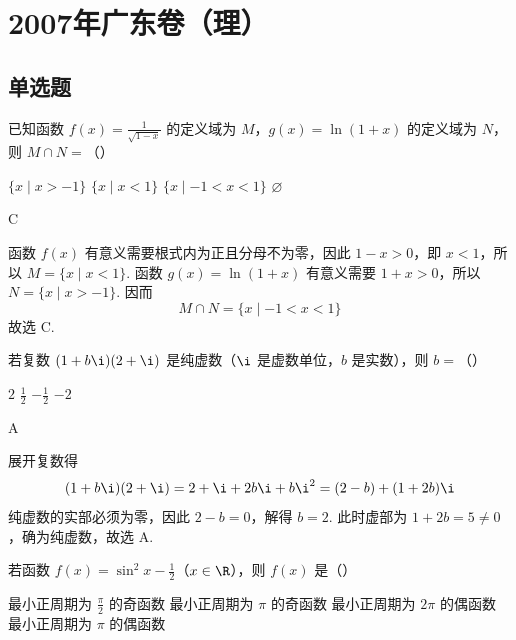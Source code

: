 \chapter{2007年广东卷（理）}

\section{单选题}

\begin{problem}
已知函数 \( f(x) = \frac{1}{\sqrt{1 - x}} \) 的定义域为 \(M\)，\(g(x) = \ln (1 + x)\) 的定义域为 \(N\)，则 \( M \cap N = \)（\quad）

\choices
    {\( \{x \mid x > -1\} \)}
    {\( \{x \mid x < 1\} \)}
    {\( \{x \mid -1 < x < 1\} \)}
    {\(\varnothing\)}
\end{problem}

\begin{answer}
C
\end{answer}

\begin{solution}
函数 \(f(x)\) 有意义需要根式内为正且分母不为零，因此 \(1-x>0\)，即 \(x<1\)，所以 \(M=\{x\mid x<1\}\). 函数 \(g(x)=\ln(1+x)\) 有意义需要 \(1+x>0\)，所以 \(N=\{x\mid x>-1\}\). 因而
\[
M\cap N=\{x\mid -1<x<1\}
\]
故选 C.
\end{solution}

\begin{problem}
若复数 \((1 + b\i)(2 + \i)\) 是纯虚数（\(\i\) 是虚数单位，\(b\) 是实数），则 \(b =\)（\quad）

\choices
    {\(2\)}
    {\(\frac{1}{2}\)}
    {\(-\frac{1}{2}\)}
    {\(-2\)}
\end{problem}

\begin{answer}
A
\end{answer}

\begin{solution}
展开复数得
\[
(1+b\i)(2+\i)=2+\i+2b\i+b\i^2=(2-b)+(1+2b)\i
\]
纯虚数的实部必须为零，因此 \(2-b=0\)，解得 \(b=2\). 此时虚部为 \(1+2b=5\ne0\)，确为纯虚数，故选 A.
\end{solution}

\begin{problem}
若函数 \( f(x) = \sin^2 x - \frac{1}{2} \)（\(x \in \R\)），则 \( f(x) \) 是（\quad）

\choices
    {最小正周期为 \(\frac{\pi}{2}\) 的奇函数}
    {最小正周期为 \(\pi\) 的奇函数}
    {最小正周期为 \(2\pi\) 的偶函数}
    {最小正周期为 \(\pi\) 的偶函数}
\end{problem}

